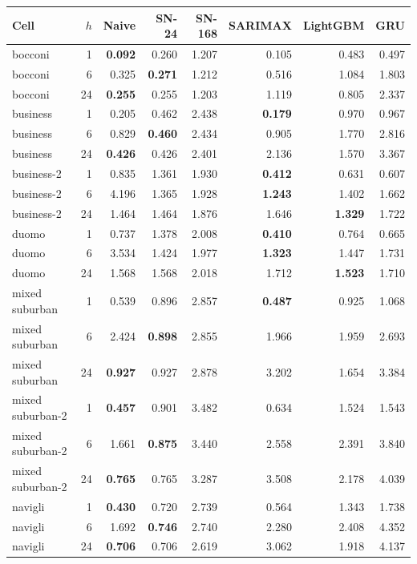 \begin{tabular}{l r rrrrrr}
\toprule
Cell & $h$ & Naive & SN-24 & SN-168 & SARIMAX & LightGBM & GRU \\
\midrule
bocconi & 1 & \textbf{0.092} & 0.260 & 1.207 & 0.105 & 0.483 & 0.497 \\
bocconi & 6 & 0.325 & \textbf{0.271} & 1.212 & 0.516 & 1.084 & 1.803 \\
bocconi & 24 & \textbf{0.255} & 0.255 & 1.203 & 1.119 & 0.805 & 2.337 \\
business & 1 & 0.205 & 0.462 & 2.438 & \textbf{0.179} & 0.970 & 0.967 \\
business & 6 & 0.829 & \textbf{0.460} & 2.434 & 0.905 & 1.770 & 2.816 \\
business & 24 & \textbf{0.426} & 0.426 & 2.401 & 2.136 & 1.570 & 3.367 \\
business-2 & 1 & 0.835 & 1.361 & 1.930 & \textbf{0.412} & 0.631 & 0.607 \\
business-2 & 6 & 4.196 & 1.365 & 1.928 & \textbf{1.243} & 1.402 & 1.662 \\
business-2 & 24 & 1.464 & 1.464 & 1.876 & 1.646 & \textbf{1.329} & 1.722 \\
duomo & 1 & 0.737 & 1.378 & 2.008 & \textbf{0.410} & 0.764 & 0.665 \\
duomo & 6 & 3.534 & 1.424 & 1.977 & \textbf{1.323} & 1.447 & 1.731 \\
duomo & 24 & 1.568 & 1.568 & 2.018 & 1.712 & \textbf{1.523} & 1.710 \\
mixed suburban & 1 & 0.539 & 0.896 & 2.857 & \textbf{0.487} & 0.925 & 1.068 \\
mixed suburban & 6 & 2.424 & \textbf{0.898} & 2.855 & 1.966 & 1.959 & 2.693 \\
mixed suburban & 24 & \textbf{0.927} & 0.927 & 2.878 & 3.202 & 1.654 & 3.384 \\
mixed suburban-2 & 1 & \textbf{0.457} & 0.901 & 3.482 & 0.634 & 1.524 & 1.543 \\
mixed suburban-2 & 6 & 1.661 & \textbf{0.875} & 3.440 & 2.558 & 2.391 & 3.840 \\
mixed suburban-2 & 24 & \textbf{0.765} & 0.765 & 3.287 & 3.508 & 2.178 & 4.039 \\
navigli & 1 & \textbf{0.430} & 0.720 & 2.739 & 0.564 & 1.343 & 1.738 \\
navigli & 6 & 1.692 & \textbf{0.746} & 2.740 & 2.280 & 2.408 & 4.352 \\
navigli & 24 & \textbf{0.706} & 0.706 & 2.619 & 3.062 & 1.918 & 4.137 \\
\bottomrule
\end{tabular}
